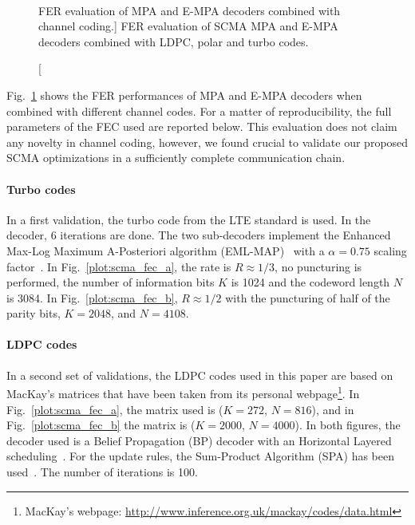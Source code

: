 \begin{figure}[htp]
  \centering
  \\
  \caption
    [FER evaluation of MPA and E-MPA decoders combined with channel coding.]
    {FER evaluation of SCMA MPA and E-MPA decoders combined with LDPC, polar
    and turbo codes.}
  \label{plot:scma_fec}
\end{figure}

Fig.~\ref{plot:scma_fec} shows the FER performances of MPA and E-MPA decoders
when combined with different channel codes. For a matter of reproducibility, the
full parameters of the FEC used are reported below. This evaluation does not
claim  any novelty in channel coding, however, we found crucial to validate our
proposed SCMA optimizations in a sufficiently complete communication chain.

\paragraph{Turbo codes}

In a first validation, the turbo code from the LTE standard is used. In the
decoder, 6 iterations are done. The two sub-decoders implement the Enhanced
Max-Log Maximum A-Posteriori algorithm (EML-MAP)~\cite{Robertson1995} with a
$\alpha = 0.75$ scaling factor~\cite{Vogt2000}. In Fig.~\ref{plot:scma_fec_a},
the rate is $R \approx 1/3$, no puncturing is performed, the number of
information bits $K$ is 1024 and the codeword length $N$ is 3084. In
Fig.~\ref{plot:scma_fec_b}, $R \approx 1/2$ with the puncturing of half of the
parity bits, $K=2048$, and $N=4108$.

\paragraph{LDPC codes}

In a second set of validations, the LDPC codes used in this paper are based on
MacKay's matrices that have been taken from its personal
webpage\footnote{MacKay's webpage: \url{http://www.inference.org.uk/mackay/codes/data.html}}.
In Fig.~\ref{plot:scma_fec_a}, the matrix used is ($K=272$, $N=816$), and in
Fig.~\ref{plot:scma_fec_b} the matrix is ($K=2000$, $N=4000$). In both figures,
the decoder used is a Belief Propagation (BP) decoder with an Horizontal Layered
scheduling~\cite{Yeo2001}. For the update rules, the Sum-Product Algorithm (SPA)
has been used~\cite{MacKay1999}. The number of iterations is 100.

